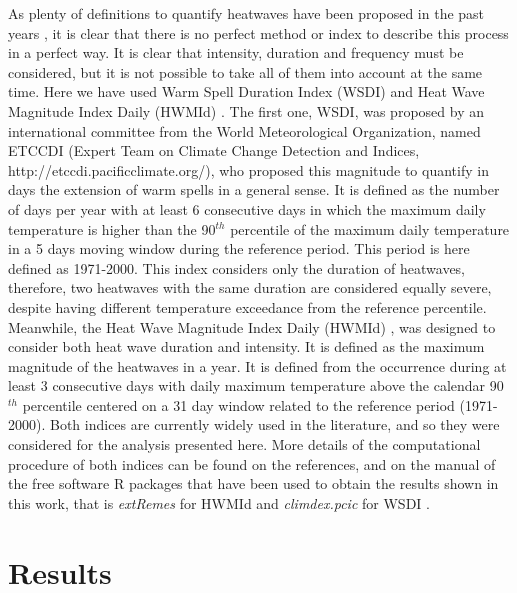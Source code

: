 As plenty of definitions to quantify heatwaves have been proposed
in the past years \cite{zha_al2011,per2015,ouz_al2016}, it is clear
that there is no perfect method or index to describe this process in a
perfect way. It is clear that intensity, duration and frequency must
be considered, but it is not possible to take all of them into account
at the same time. Here we have used Warm Spell Duration Index (WSDI) \cite{zha_al2011}
and Heat Wave Magnitude Index Daily (HWMId) \cite{rus_al2015}.
The first one, WSDI, was proposed by an international committee from the
World Meteorological Organization, named ETCCDI (Expert Team on Climate Change 
Detection and Indices, http://etccdi.pacificclimate.org/), who proposed
this magnitude to quantify in days the extension of warm spells in a general sense.
It is defined as the number of days per year with at least 6 consecutive days 
in which the maximum daily temperature is higher than the 90$^{th}$ percentile of the 
maximum daily temperature in a 5 days moving window during the reference period. 
This period is here defined as 1971-2000. This index considers only the duration 
of heatwaves, therefore, two heatwaves with the same duration are considered equally 
severe, despite having different temperature exceedance from the reference percentile.
Meanwhile, the Heat Wave Magnitude Index Daily (HWMId)
\cite{rus_al2014,rus_al2015,dos_al2018}, was designed
to consider both heat wave duration and intensity. It is defined as the maximum
magnitude of the heatwaves in a year. It is defined from the occurrence during
at least 3 consecutive days with daily maximum temperature above the calendar 90$^{th}$
percentile centered on a 31 day window related to the reference period (1971-2000).
Both indices are currently widely used in the literature, and so they were considered
for the analysis presented here. More details of the computational procedure of
both indices can be found on the references, and on the manual of the free
software R packages that have been used to obtain the results shown in
this work, that is {\it extRemes} \cite{ext2016} for HWMId and {\it climdex.pcic}
for WSDI \cite{cli2018}.

\section{Results}

